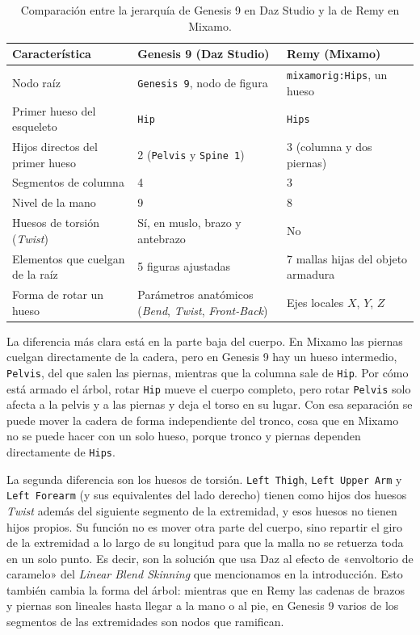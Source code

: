 \begin{table}[H]
\centering
\small
\begin{tabular}{@{}p{5.2cm}p{4.9cm}p{4.9cm}@{}}
\toprule
\textbf{Característica} & \textbf{Genesis 9 (Daz Studio)} & \textbf{Remy (Mixamo)} \\
\midrule
Nodo raíz & \texttt{Genesis 9}, nodo de figura & \texttt{mixamorig:Hips}, un hueso \\
Primer hueso del esqueleto & \texttt{Hip} & \texttt{Hips} \\
Hijos directos del primer hueso & 2 (\texttt{Pelvis} y \texttt{Spine 1}) & 3 (columna y dos piernas) \\
Segmentos de columna & 4 & 3 \\
Nivel de la mano & 9 & 8 \\
Huesos de torsión (\textit{Twist}) & Sí, en muslo, brazo y antebrazo & No \\
Elementos que cuelgan de la raíz & 5 figuras ajustadas & 7 mallas hijas del objeto armadura \\
Forma de rotar un hueso & Parámetros anatómicos (\textit{Bend}, \textit{Twist}, \textit{Front-Back}) & Ejes locales $X$, $Y$, $Z$ \\
\bottomrule
\end{tabular}
\caption{Comparación entre la jerarquía de Genesis 9 en Daz Studio y la de Remy en Mixamo.}
\label{tab:daz_vs_mixamo}
\end{table}

La diferencia más clara está en la parte baja del cuerpo. En Mixamo las piernas cuelgan directamente de la cadera, pero en Genesis 9 hay un hueso intermedio, \texttt{Pelvis}, del que salen las piernas, mientras que la columna sale de \texttt{Hip}. Por cómo está armado el árbol, rotar \texttt{Hip} mueve el cuerpo completo, pero rotar \texttt{Pelvis} solo afecta a la pelvis y a las piernas y deja el torso en su lugar. Con esa separación se puede mover la cadera de forma independiente del tronco, cosa que en Mixamo no se puede hacer con un solo hueso, porque tronco y piernas dependen directamente de \texttt{Hips}.

La segunda diferencia son los huesos de torsión. \texttt{Left Thigh}, \texttt{Left Upper Arm} y \texttt{Left Forearm} (y sus equivalentes del lado derecho) tienen como hijos dos huesos \textit{Twist} además del siguiente segmento de la extremidad, y esos huesos no tienen hijos propios. Su función no es mover otra parte del cuerpo, sino repartir el giro de la extremidad a lo largo de su longitud para que la malla no se retuerza toda en un solo punto. Es decir, son la solución que usa Daz al efecto de «envoltorio de caramelo» del \textit{Linear Blend Skinning} que mencionamos en la introducción. Esto también cambia la forma del árbol: mientras que en Remy las cadenas de brazos y piernas son lineales hasta llegar a la mano o al pie, en Genesis 9 varios de los segmentos de las extremidades son nodos que ramifican.

